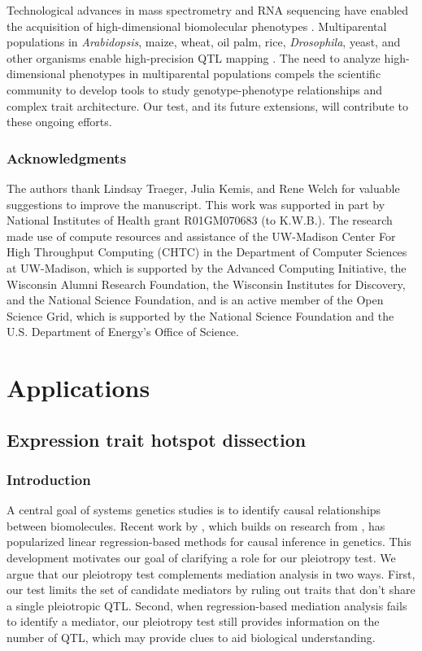 \documentclass[oneside]{book}
\begin{document}
Technological advances
in mass spectrometry and RNA sequencing have enabled the acquisition of
high-dimensional biomolecular phenotypes
\citep{ozsolak2011rna,han2012multi}. Multiparental populations in
\textit{Arabidopsis}, maize, wheat, oil palm, rice,
\textit{Drosophila}, yeast, and other organisms enable high-precision
QTL mapping \citep{yu2008genetic, tisne2017identification,
  stanley2017genetic, raghavan2017approaches, mackay2012drosophila,
  kover2009multiparent, cubillos2013high}. The need to analyze
high-dimensional phenotypes in multiparental populations compels the
scientific community to develop tools to study genotype-phenotype
relationships and complex trait architecture. Our test, and its future
extensions, will contribute to these ongoing efforts.




\subsection*{Acknowledgments}

The authors thank Lindsay Traeger, Julia Kemis, and Rene Welch for
valuable suggestions to improve the manuscript. This work was
supported in part by National Institutes of Health grant R01GM070683
(to K.W.B.). The research made use of compute resources and assistance
of the UW-Madison Center For High Throughput Computing (CHTC) in the
Department of Computer Sciences at UW-Madison, which is supported by
the Advanced Computing Initiative, the Wisconsin Alumni Research
Foundation, the Wisconsin Institutes for Discovery, and the National
Science Foundation, and is an active member of the Open Science Grid,
which is supported by the National Science Foundation and the U.S.
Department of Energy's Office of Science.

\chapter{Applications}
\section{Expression trait hotspot dissection}
\subsection{Introduction}

A central goal of systems genetics studies is to identify causal relationships between biomolecules. Recent work by \citet{chick2016defining}, which builds on research from \citet{baron1986moderator}, has popularized linear regression-based methods for causal inference in genetics. This development motivates our goal of clarifying a role for our pleiotropy test. We argue that our pleiotropy test complements mediation analysis in two ways. First, our test limits the set of candidate mediators by ruling out traits that don't share a single pleiotropic QTL. Second, when regression-based mediation analysis fails to identify a mediator, our pleiotropy test still provides information on the number of QTL, which may provide clues to aid biological understanding.
\end{document}
